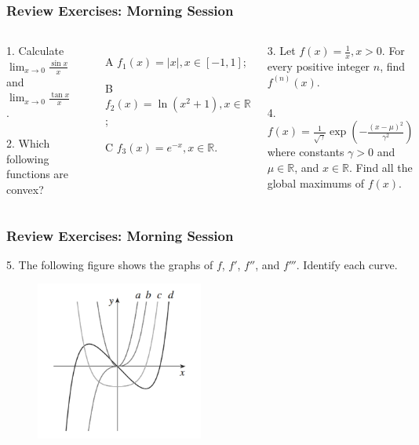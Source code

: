 \documentclass{beamer}
\begin{document}
\begin{frame}
\frametitle{Review Exercises: Morning Session}
\begin{columns}[t] %

1. Calculate $\lim_{x \rightarrow 0} \frac{\sin x}{x}$ and $\lim_{x \rightarrow 0} \frac{\tan x}{x}$.
\\~\\
2. Which following functions are convex?
\begin{itemize}
\item[A] $f_1(x) = \vert x \vert, x\in [-1,1]$;
\item[B] $f_2(x) = \ln(x^2+1), x \in \mathbb{R}$;
\item[C] $f_3(x) = e^{-x}, x\in \mathbb{R}$.
\end{itemize}

3. Let $f(x) = \frac{1}{x}, x>0$. For every positive integer $n$, find $f^{(n)}(x)$.
\\~\\
4. $f(x) = \frac{1}{\sqrt{\gamma}} \exp \left(-\frac{(x-\mu)^2}{\gamma^2}\right)$ where constants $\gamma > 0$ and $\mu \in \mathbb{R}$, and $x\in \mathbb{R}$. Find all the global maximums of $f(x)$.

\end{columns}
\end{frame}

\begin{frame}
\frametitle{Review Exercises: Morning Session}
5. The following figure shows the graphs of $f$, $f'$, $f''$, and $f'''$. Identify each curve.
\vspace*{-0.2in}
\begin{figure}[H]
\centering
\includegraphics[width=5.5cm]{Derivative-ex-1.png}
\end{figure}
\end{frame}
\end{document}
